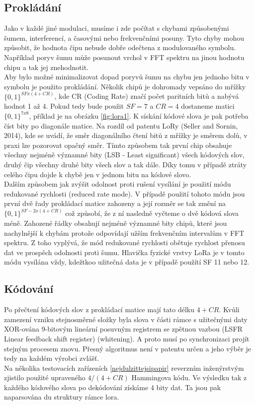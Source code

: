 \documentclass{ctuthesis}
\begin{document}
\subsection{Prokládání}
Jako v každé jiné modulaci, musíme i zde počítat s chybami způsobenými šumem, interferencí, a časovými nebo frekvenčními posuny. Tyto chyby mohou způsobit, že hodnota čipu nebude dobře odečtena z modulovaného symbolu. Například poryv šumu může posunout vrchol v FFT spektru na jinou hodnotu chipu a tak jej znehodnotit.\\
Aby bylo možné minimalizovat dopad poryvů šumu na chybu jen jednoho bitu v symbolu je použito prokládání. Několik chipů je dohromady vepsáno do mřížky $\{0,1\}^{SF x (4 + CR)}$, kde CR (Coding Rate) značí počet paritních bitů a nabývá hodnot 1 až 4. Pokud tedy bude použit $SF = 7$ a $CR =4$ dostaneme matici  $\{0,1\}^{7 x 8}$, příklad je na obrázku \ref{fig:lora1}. K sískání kódové slova je pak potřeba číst bity po diagonále matice. Na rozdíl od patentu LoRy (Seller and Sornin, 2014), kde se uvádí, že směr diagonálního čtení bitů z mřížky je směrem dolů, v praxi lze pozorovat opačný směr. Tímto způsobem tak první chip obsahuje všechny nejméně významné bity (LSB - Least significant) všech kódových slov, druhý čip všechny druhé bity všech slov a tak dále. Díky tomu v případě ztráty celého čipu dojde k chybě jen v jednom bitu na kódové slovo.\\
Dalším způsobem jak zvýšit odolnost proti rušení vysílání je použití módu redukované rychlosti (reduced rate mode). V případě použití tohoto módu jsou první dvě řady prokládací matice zahozeny a její rozměr se tak změní na $\{0,1\}^{SF-2 x (4 + CR)}$ což způsobí, že z ní nasledně vyčteme o dvě kódová slova méně. Zahozené řádky obsahují nejméně významné bity chipů, které jsou nachylnější k chybám protože odpovídají užším frekvenčním intervalům v FFT spektru. Z toho vyplývá, že mód redukované rychlosti obětuje rychlost přenosu dat ve prospěch odolnosti proti šumu. Hlavička fyzické vrstvy LoRa je v tomto módu vysílána vždy, kdežtkoo užitečná data je v případě použítí SF 11 nebo 12.

\subsection{Kódování}
Po přečtení kódových slov z prokládací matice mají tato délku $4 + CR$. Kvůli zamezení vzniku stejnosměrné složky byla slova v části rámce s užitečnými daty XOR-ována 9-bitovým lineární posuvným registrem se zpětnou vazbou (LSFR Linear feedback shift register) (whitening). A proto musí po synchronizaci projít stejným procesem znovu. Přesný algoritmus není v patentu určen a jeho výběr je tedy na každém výrobci zvlášť. \\
Na několika testovacích zařízeních \ref{nejdulzittejsipapir} reverzním inženýrstvým zjistilo použité upraveného $4/(4 + CR)$ Hammingova kódu. Ve výsledku tak z každého kódového slova po dekódování získáme 4 bity dat. Ta jsou pak naparsována du struktury rámce lora.
\end{document}
